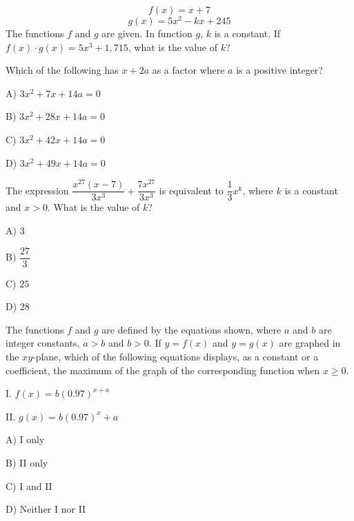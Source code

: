 \vfill
\noindent\begin{minipage}{\linewidth}
\par\smallskip
$$f(x)=x+7$$ $$g(x)=5x^2-kx+245$$ The functions $f$ and $g$ are given. In function $g$, $k$ is a constant. If $f(x)\cdot g(x)=5x^3+1{,}715$, what is the value of $k$?
\end{minipage}
\vfill
\clearpage
\noindent\begin{minipage}{\linewidth}
\par\smallskip
Which of the following has $x+2a$ as a factor where $a$ is a positive integer?
\begin{satchoices}
  \item[A)] $3x^2+7x+14a=0$
  \item[B)] $3x^2+28x+14a=0$
  \item[C)] $3x^2+42x+14a=0$
  \item[D)] $3x^2+49x+14a=0$
\end{satchoices}
\end{minipage}
\vfill
\noindent\begin{minipage}{\linewidth}
\par\smallskip
The expression $\dfrac{x^{27}(x-7)}{3x^3}+\dfrac{7x^{27}}{3x^3}$ is equivalent to $\dfrac{1}{3}x^k$, where $k$ is a constant and $x>0$. What is the value of $k$?
\begin{satchoices}
  \item[A)] $3$
  \item[B)] $\dfrac{27}{3}$
  \item[C)] $25$
  \item[D)] $28$
\end{satchoices}
\end{minipage}
\vfill
\noindent\begin{minipage}{\linewidth}
\par\smallskip
The functions $f$ and $g$ are defined by the equations shown, where $a$ and $b$ are integer constants, $a>b$ and $b>0$. If $y=f(x)$ and $y=g(x)$ are graphed in the $xy$-plane, which of the following equations displays, as a constant or a coefficient, the maximum of the graph of the corresponding function when $x\ge0$.\par\smallskip I. $f(x)=b(0.97)^{x+a}$\par II. $g(x)=b(0.97)^x+a$
\begin{satchoices}
  \item[A)] I only
  \item[B)] II only
  \item[C)] I and II
  \item[D)] Neither I nor II
\end{satchoices}
\end{minipage}
